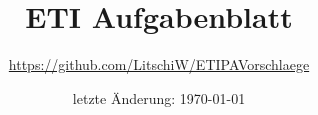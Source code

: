\makeatletter
\pagestyle{fancy}


\lhead{}
\cfoot{\bigskip \thepage}
\makeatother


\title{ETI Aufgabenblatt}
\date{letzte Änderung: \today}
\author{\url{https://github.com/LitschiW/ETIPAVorschlaege}}

\maketitle
\thispagestyle{empty}
\newpage
\setcounter{page}{1} %
